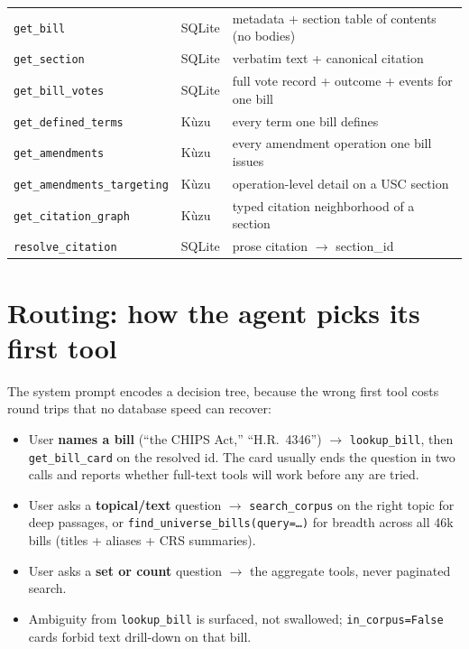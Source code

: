 \documentclass[11pt]{article}
\newcommand{\code}[1]{\texttt{#1}}
\begin{document}
\begin{longtable}{@{}p{3.6cm}p{1.6cm}p{9.2cm}@{}}
\code{get\_bill} & SQLite & metadata + section table of contents (no bodies) \\
\code{get\_section} & SQLite & verbatim text + canonical citation \\
\code{get\_bill\_votes} & SQLite & full vote record + outcome + events for
one bill \\
\code{get\_defined\_terms} & K\`uzu & every term one bill defines \\
\code{get\_amendments} & K\`uzu & every amendment operation one bill issues \\
\code{get\_amendments\_targeting} & K\`uzu & operation-level detail on a USC
section \\
\code{get\_citation\_graph} & K\`uzu & typed citation neighborhood of a section \\
\code{resolve\_citation} & SQLite & prose citation $\to$ section\_id \\
\bottomrule
\end{longtable}

\section{Routing: how the agent picks its first tool}
\label{sec:routing}

The system prompt encodes a decision tree, because the wrong first tool costs
round trips that no database speed can recover:

\begin{itemize}[itemsep=2pt]
  \item User \textbf{names a bill} (``the CHIPS Act,'' ``H.R.~4346'') $\to$
        \code{lookup\_bill}, then \code{get\_bill\_card} on the resolved id.
        The card usually ends the question in two calls and reports whether
        full-text tools will work before any are tried.
  \item User asks a \textbf{topical/text} question $\to$
        \code{search\_corpus} on the right topic for deep passages, or
        \code{find\_universe\_bills(query=\ldots)} for breadth across all
        46k bills (titles + aliases + CRS summaries).
  \item User asks a \textbf{set or count} question $\to$ the aggregate tools,
        never paginated search.
  \item Ambiguity from \code{lookup\_bill} is surfaced, not swallowed;
        \code{in\_corpus=False} cards forbid text drill-down on that bill.
\end{itemize}
\end{document}
